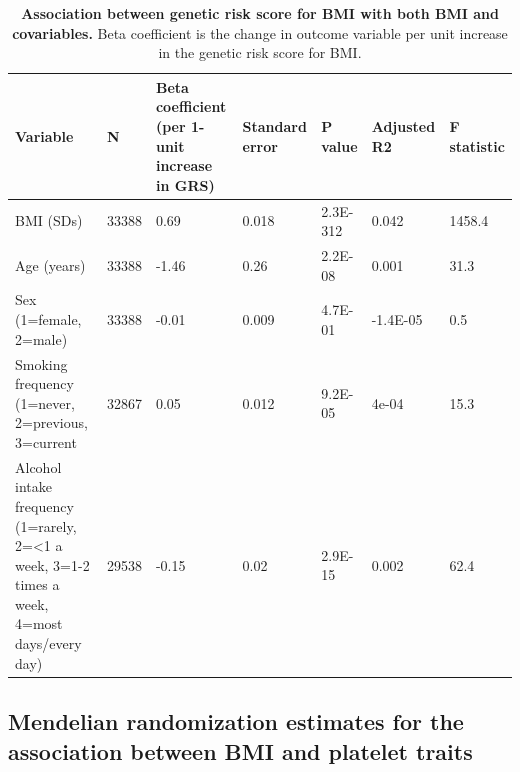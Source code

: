 \documentclass[11pt,twoside]{bristolthesis}
\begin{document}
\begin{table}

\caption[Association between genetic risk score for BMI with both BMI and covariables]{\label{tab:INT-GRS-confounders-platelets}\textbf{Association between genetic risk score for BMI with both BMI and covariables.} Beta coefficient is the change in outcome variable per unit increase in the genetic risk score for BMI.}
\centering
\fontsize{8}{10}\selectfont
\begin{tabu} to 
\toprule
Variable & N & Beta coefficient (per 1-unit increase in GRS) & Standard error & P value & Adjusted R2 & F statistic\\
\midrule
BMI (SDs) & 33388 & 0.69 & 0.018 & 2.3E-312 & 0.042 & 1458.4\\
Age (years) & 33388 & -1.46 & 0.26 & 2.2E-08 & 0.001 & 31.3\\
Sex (1=female, 2=male) & 33388 & -0.01 & 0.009 & 4.7E-01 & -1.4E-05 & 0.5\\
Smoking frequency (1=never, 2=previous, 3=current & 32867 & 0.05 & 0.012 & 9.2E-05 & 4e-04 & 15.3\\
Alcohol intake frequency (1=rarely, 2=<1 a week, 3=1-2 times a week, 4=most days/every day) & 29538 & -0.15 & 0.02 & 2.9E-15 & 0.002 & 62.4\\
\bottomrule
\end{tabu}
\end{table}
\hypertarget{mendelian-randomization-estimates-for-the-association-between-bmi-and-platelet-traits}{%
\subsection{Mendelian randomization estimates for the association between BMI and platelet traits}\label{mendelian-randomization-estimates-for-the-association-between-bmi-and-platelet-traits}}
\end{document}
